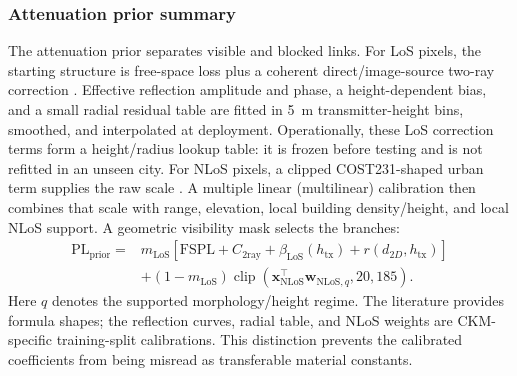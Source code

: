 \documentclass[journal]{IEEEtran}
\begin{document}
\subsubsection{Attenuation prior summary}
The attenuation prior separates visible and blocked links. For LoS pixels, the
starting structure is free-space loss plus a coherent direct/image-source
two-ray correction \cite{rappaport,goldsmith,wocc2021}. Effective reflection
amplitude and phase, a height-dependent bias, and a small radial residual table
are fitted in \SI{5}{m} transmitter-height bins, smoothed, and interpolated at
deployment. Operationally, these LoS correction terms form a height/radius
lookup table: it is frozen before testing and is not refitted in an unseen
city. For NLoS pixels, a clipped COST231-shaped urban term supplies the raw
scale \cite{cost231}. A multiple linear (multilinear)
calibration then combines
that scale with range, elevation, local building density/height, and local NLoS
support. A geometric visibility mask selects the branches:
\begin{equation}
\begin{aligned}
\mathrm{PL}_{\mathrm{prior}}={}&m_{\mathrm{LoS}}
[\mathrm{FSPL}+C_{\mathrm{2ray}}+\beta_{\mathrm{LoS}}(h_{\mathrm{tx}})
+r(d_{2D},h_{\mathrm{tx}})]\\
&+(1-m_{\mathrm{LoS}})
\operatorname{clip}(\mathbf{x}_{\mathrm{NLoS}}^{\top}
\mathbf{w}_{\mathrm{NLoS},q},20,185).
\end{aligned}
\label{eq:concise-attenuation-prior}
\end{equation}
Here \(q\) denotes the supported morphology/height regime. The literature
provides formula shapes; the reflection curves, radial table, and NLoS weights
are CKM-specific training-split calibrations. This distinction prevents the
calibrated coefficients from being misread as transferable material constants.
\end{document}
